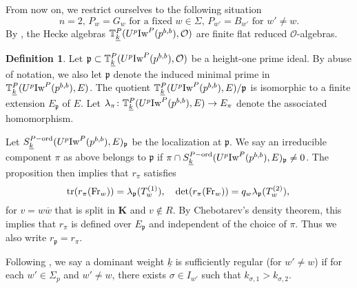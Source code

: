 \documentclass[leqno]{amsart}
\theoremstyle{definition}
\newtheorem{defn}[thm]{Definition}
\theoremstyle{remark}
\newcommand{\oo}{\mathcal{O}}
\DeclareMathOperator{\mtr}{tr}
\newcommand{\Fr}{\textnormal{Fr}} %
\newcommand{\fp}{\mathfrak{p}}
\newcommand{\K}{{\mathbf{K}}} %
\newcommand{\bw}{\overline{w}}
\newcommand{\wt}[1]{\underline{ #1 }}
\newcommand{\Iw}{\textnormal{Iw}} %
\newcommand{\TT}{\mathbb{T}} %
\newcommand{\ord}{\textnormal{ord}} %
\begin{document}
From now on,
we restrict ourselves to the following situation
\begin{equation}\label{cond:parabolic}\tag{P}
	n=2,\, 
	P_w=G_w \text{ for a fixed }w\in \Sigma,\,
	P_{w'}=B_{w'} \text{ for } w'\neq w.
\end{equation}
By \cite[Lem 2.14]{ger}, 
the Hecke algebras
$\TT^P_{\wt{k}}(U^p\Iw^P(p^{b,b}),\oo)$
are finite flat reduced $\oo$-algebras.
\begin{defn}\label{def:rep_prime}
	Let $\fp\subset \TT^P_{\wt{k}}(U^p\Iw^P(p^{b,b}),\oo)$
	be a height-one prime ideal.
	By abuse of notation, 
	we also let $\fp$ denote the induced minimal prime
	in $\TT^P_{\wt{k}}(U^p\Iw^P(p^{b,b}),E)$.
	The quotient $\TT^P_{\wt{k}}(U^p\Iw^P(p^{b,b}),E)/\fp$
	is isomorphic to a finite extension $E_{\fp}$ of $E$.
	Let 
	$\lambda_\pi\colon \TT^P_{\wt{k}}(U^p\Iw^P(p^{b,b}),E)\to E_\pi$
	denote the associated homomorphism.

	Let $S_{\wt{k}}^{P-\ord}(U^p\Iw^P(p^{b,b}),E)_{\fp}$
	be the localization at $\fp$.
	We say an irreducible component $\pi$ as above
	belongs to  $\fp$ if 
	$\pi\cap S_{\wt{k}}^{P-\ord}(U^p\Iw^P(p^{b,b}),E)_{\fp}\neq 0$.
	The proposition then implies that
	$r_\pi$ satisfies
	\begin{equation}\label{eq:Gal_hecke_away_p}
		\mtr(r_\pi(\Fr_w))=\lambda_\fp(T_w^{(1)}),\quad
		\det(r_\pi(\Fr_w))=q_w\lambda_\fp(T_w^{(2)}),\,
	\end{equation}
	for $v=w\bw$ that is split in  $\K$ and $v\notin R$. 
	By Chebotarev's density theorem,
	this implies that $r_\pi$ is defined over  $E_{\fp}$
	and independent of the choice of $\pi$.
	Thus we also write $r_\fp=r_\pi$.
\end{defn}




Following \cite{ger},
we say a dominant weight $\wt{k}$ is sufficiently regular
(for $w'\neq w$)
if for each $w'\in \Sigma_p$  and $w'\neq w$,
there exists  $\sigma\in I_{w'}$
such that  $k_{\sigma,1}>k_{\sigma,2}$.
\end{document}
